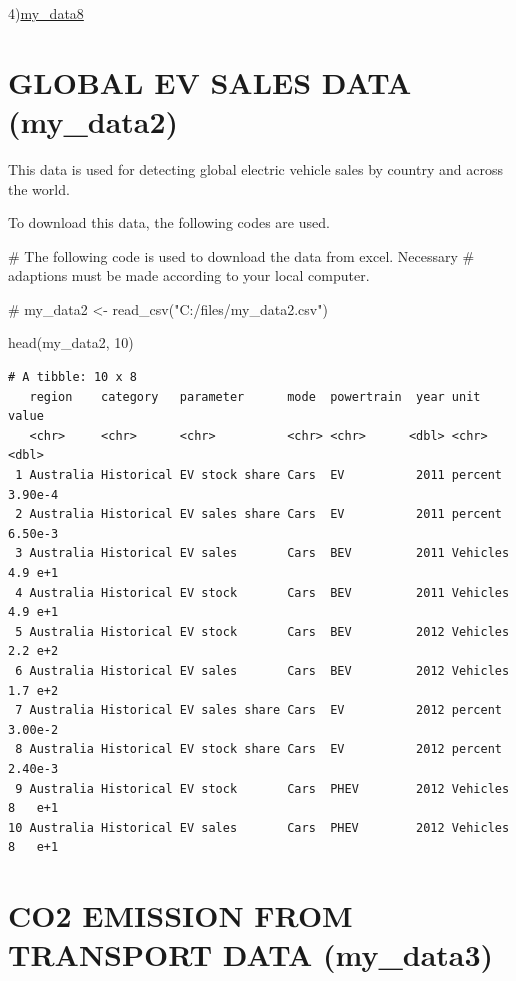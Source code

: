 \documentclass[
  11pt,
  a4paper,
  DIV=11,
  numbers=noendperiod]{scrartcl}
\newenvironment{Shaded}{\begin{snugshade}}{\end{snugshade}}
\newcommand{\CommentTok}[1]{\textcolor[rgb]{0.37,0.37,0.37}{#1}}
\newcommand{\DecValTok}[1]{\textcolor[rgb]{0.68,0.00,0.00}{#1}}
\newcommand{\FunctionTok}[1]{\textcolor[rgb]{0.28,0.35,0.67}{#1}}
\newcommand{\NormalTok}[1]{\textcolor[rgb]{0.00,0.23,0.31}{#1}}
\begin{document}
4)\href{https://ourworldindata.org/population-growth}{my\_data8}

\section{GLOBAL EV SALES DATA
(my\_data2)}\label{global-ev-sales-data-my_data2}

This data is used for detecting global electric vehicle sales by country
and across the world.

To download this data, the following codes are used.

\begin{Shaded}
\begin{Highlighting}[]
\CommentTok{\# The following code is used to download the data from excel. Necessary}
\CommentTok{\# adaptions must be made according to your local computer.}

\CommentTok{\# my\_data2 \textless{}{-} read\_csv("C:/files/my\_data2.csv")}

\FunctionTok{head}\NormalTok{(my\_data2, }\DecValTok{10}\NormalTok{)}
\end{Highlighting}
\end{Shaded}

\begin{verbatim}
# A tibble: 10 x 8
   region    category   parameter      mode  powertrain  year unit         value
   <chr>     <chr>      <chr>          <chr> <chr>      <dbl> <chr>        <dbl>
 1 Australia Historical EV stock share Cars  EV          2011 percent    3.90e-4
 2 Australia Historical EV sales share Cars  EV          2011 percent    6.50e-3
 3 Australia Historical EV sales       Cars  BEV         2011 Vehicles   4.9 e+1
 4 Australia Historical EV stock       Cars  BEV         2011 Vehicles   4.9 e+1
 5 Australia Historical EV stock       Cars  BEV         2012 Vehicles   2.2 e+2
 6 Australia Historical EV sales       Cars  BEV         2012 Vehicles   1.7 e+2
 7 Australia Historical EV sales share Cars  EV          2012 percent    3.00e-2
 8 Australia Historical EV stock share Cars  EV          2012 percent    2.40e-3
 9 Australia Historical EV stock       Cars  PHEV        2012 Vehicles   8   e+1
10 Australia Historical EV sales       Cars  PHEV        2012 Vehicles   8   e+1
\end{verbatim}

\section{CO2 EMISSION FROM TRANSPORT DATA
(my\_data3)}\label{co2-emission-from-transport-data-my_data3}
\end{document}
